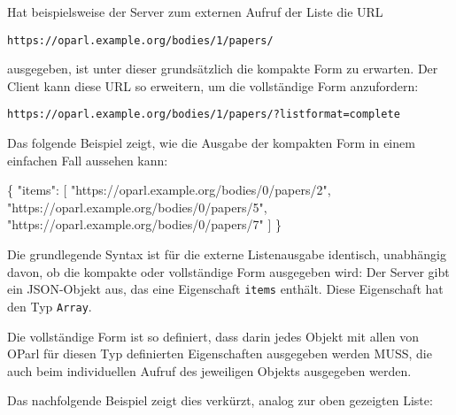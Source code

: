 \documentclass[,a4paper]{article}
\newenvironment{Shaded}{}{}
\newcommand{\DataTypeTok}[1]{\textcolor[rgb]{0.56,0.13,0.00}{{#1}}}
\newcommand{\StringTok}[1]{\textcolor[rgb]{0.25,0.44,0.63}{{#1}}}
\newcommand{\OtherTok}[1]{\textcolor[rgb]{0.00,0.44,0.13}{{#1}}}
\newcommand{\FunctionTok}[1]{\textcolor[rgb]{0.02,0.16,0.49}{{#1}}}
\begin{document}
Hat beispielsweise der Server zum externen Aufruf der Liste die URL

\begin{verbatim}
https://oparl.example.org/bodies/1/papers/
\end{verbatim}

ausgegeben, ist unter dieser grundsätzlich die kompakte Form zu
erwarten. Der Client kann diese URL so erweitern, um die vollständige
Form anzufordern:

\begin{verbatim}
https://oparl.example.org/bodies/1/papers/?listformat=complete
\end{verbatim}

Das folgende Beispiel zeigt, wie die Ausgabe der kompakten Form in einem
einfachen Fall aussehen kann:

\begin{Shaded}
\begin{Highlighting}[]
\FunctionTok{\{}
    \DataTypeTok{"items"}\FunctionTok{:} \OtherTok{[}
        \StringTok{"https://oparl.example.org/bodies/0/papers/2"}\OtherTok{,}
        \StringTok{"https://oparl.example.org/bodies/0/papers/5"}\OtherTok{,}
        \StringTok{"https://oparl.example.org/bodies/0/papers/7"}
    \OtherTok{]}
\FunctionTok{\}}
\end{Highlighting}
\end{Shaded}

Die grundlegende Syntax ist für die externe Listenausgabe identisch,
unabhängig davon, ob die kompakte oder vollständige Form ausgegeben
wird: Der Server gibt ein JSON-Objekt aus, das eine Eigenschaft
\texttt{items} enthält. Diese Eigenschaft hat den Typ \texttt{Array}.

Die vollständige Form ist so definiert, dass darin jedes Objekt mit
allen von OParl für diesen Typ definierten Eigenschaften ausgegeben
werden MUSS, die auch beim individuellen Aufruf des jeweiligen Objekts
ausgegeben werden.

Das nachfolgende Beispiel zeigt dies verkürzt, analog zur oben gezeigten
Liste:
\end{document}
